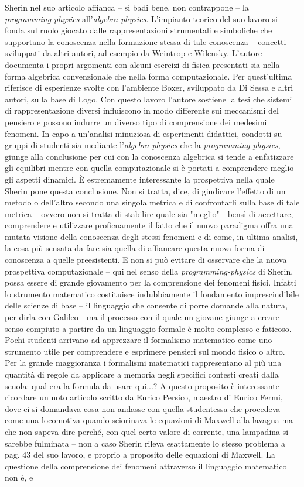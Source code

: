 Sherin nel suo articolo affianca – si badi bene, non contrappone – la \textit{programming-physics} all'\textit{algebra-physics}. L'impianto teorico del suo lavoro si fonda sul ruolo giocato dalle rappresentazioni strumentali e simboliche che supportano la conoscenza nella formazione stessa di tale conoscenza – concetti sviluppati da altri autori, ad esempio da Weintrop e Wilensky\cite{Weintrop2}. L'autore documenta i propri argomenti con alcuni esercizi di fisica presentati sia nella forma algebrica convenzionale che nella forma computazionale. Per quest'ultima riferisce di esperienze svolte con l'ambiente Boxer, sviluppato da Di Sessa e altri autori\cite{DiSessa}, sulla base di Logo. Con questo lavoro l'autore sostiene la tesi che sistemi di rappresentazione diversi influiscono in modo differente sui meccanismi del pensiero e possono indurre un diverso tipo di comprensione dei medesimi fenomeni. In capo a un'analisi minuziosa di esperimenti didattici, condotti su gruppi di studenti sia mediante l'\textit{algebra-physics} che la \textit{programming-physics}, giunge alla conclusione per cui con la conoscenza algebrica si tende a enfatizzare gli equilibri mentre con quella computazionale si è portati a comprendere meglio gli aspetti dinamici. È estremamente interessante la prospettiva nella quale Sherin pone questa conclusione. Non si tratta, dice, di giudicare l'effetto di un metodo o dell'altro secondo una singola metrica e di confrontarli sulla base di tale metrica – ovvero non si tratta di stabilire quale sia "meglio" - bensì di accettare, comprendere e utilizzare proficuamente il fatto che il nuovo paradigma offra una mutata visione della conoscenza degli stessi fenomeni e di come, in ultima analisi, la cosa più sensata da fare sia quella di affiancare questa nuova forma di conoscenza a quelle preesistenti. E non si può evitare di osservare che la nuova prospettiva computazionale – qui nel senso della \textit{programming-physics} di Sherin, possa essere di grande giovamento per la comprensione dei fenomeni fisici. Infatti lo strumento matematico costituisce indubbiamente il fondamento imprescindibile delle scienze di base – il linguaggio che consente di porre domande alla natura, per dirla con Galileo - ma il processo con il quale un giovane giunge a creare senso compiuto a partire da un linguaggio formale è molto complesso e faticoso. Pochi studenti arrivano ad apprezzare il formalismo matematico come uno strumento utile per comprendere e esprimere pensieri sul mondo fisico o altro. Per la grande maggioranza i formalismi matematici rappresentano al più una quantità di regole da applicare a memoria negli specifici contesti creati dalla scuola: qual era la formula da usare qui...? A questo proposito è interessante ricordare un noto articolo scritto da Enrico Persico\cite{Persico}, maestro di Enrico Fermi, dove ci si domandava cosa non andasse con quella studentessa che procedeva come una locomotiva quando sciorinava le equazioni di Maxwell alla lavagna ma che non sapeva dire perché, con quel certo valore di corrente, una lampadina si sarebbe fulminata – non a caso Sherin rileva esattamente lo stesso problema a pag. 43 del suo lavoro, e proprio a proposito delle equazioni di Maxwell. La questione della comprensione dei fenomeni attraverso il linguaggio matematico non è, e 